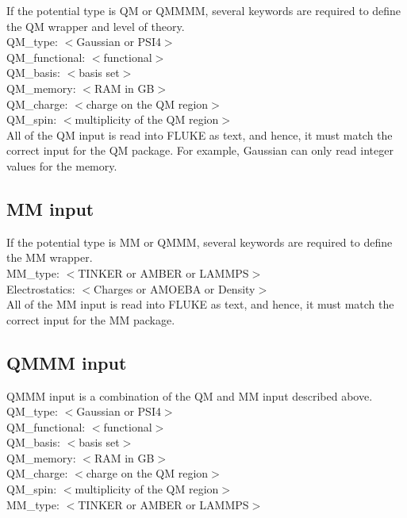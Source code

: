 \documentclass[12pt]{report}
\begin{document}
If the potential type is QM or QMMMM, several keywords are required to define
the QM wrapper and level of theory. \\

QM\_type: $<$Gaussian or PSI4$>$ \\
QM\_functional: $<$functional$>$ \\
QM\_basis: $<$basis set$>$ \\
QM\_memory: $<$RAM in GB$>$ \\
QM\_charge: $<$charge on the QM region$>$ \\
QM\_spin: $<$multiplicity of the QM region$>$ \\

All of the QM input is read into FLUKE as text, and hence, it must match the
correct input for the QM package. For example, Gaussian can only read integer
values for the memory.

\subsection{MM input}

If the potential type is MM or QMMM, several keywords are required to define
the MM wrapper. \\

MM\_type: $<$TINKER or AMBER or LAMMPS$>$ \\
Electrostatics: $<$Charges or AMOEBA or Density$>$ \\

All of the MM input is read into FLUKE as text, and hence, it must match the
correct input for the MM package.

\subsection{QMMM input}

QMMM input is a combination of the QM and MM input described above. \\

QM\_type: $<$Gaussian or PSI4$>$ \\
QM\_functional: $<$functional$>$ \\
QM\_basis: $<$basis set$>$ \\
QM\_memory: $<$RAM in GB$>$ \\
QM\_charge: $<$charge on the QM region$>$ \\
QM\_spin: $<$multiplicity of the QM region$>$ \\
MM\_type: $<$TINKER or AMBER or LAMMPS$>$ \\
\end{document}
